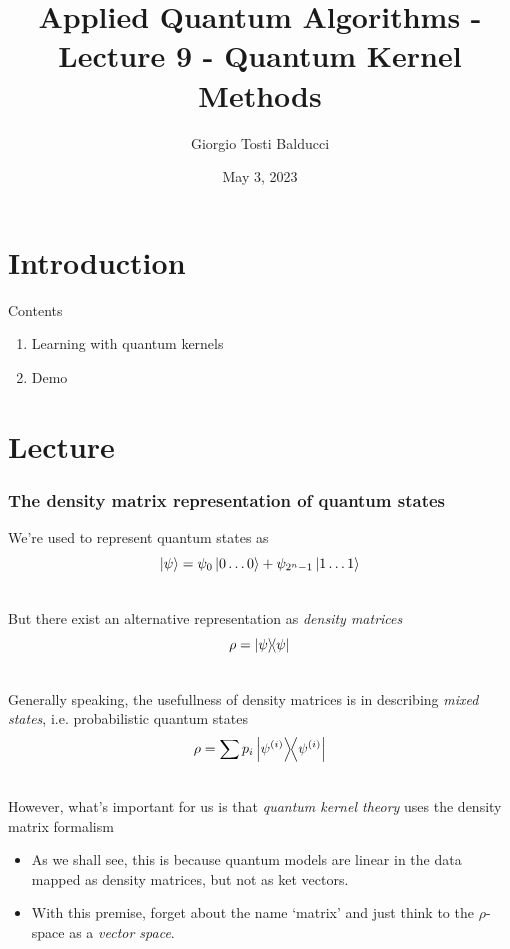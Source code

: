 \documentclass[aspectratio=43]{beamer}
\title[]{Applied Quantum Algorithms - Lecture 9 - Quantum Kernel Methods}
\institute[]{Delft University of Technology, The Netherlands}
\author{Giorgio Tosti Balducci}
\date{May 3, 2023}
\renewcommand{\cite}[1]{\footnote<.->[frame]{\fullcite{#1}}}
\begin{document}
\section{Introduction}
{
\frame{\titlepage}
}

\begin{frame}{Contents} %
\begin{enumerate}
  \item Learning with quantum kernels
  \item Demo
\end{enumerate}
\end{frame}

\section{Lecture}

\begin{frame}
  \frametitle{The density matrix representation of quantum states}
  \small
  We're used to represent quantum states as
  \[\ket{\psi} = \psi_0\ket{0\dots 0} + \psi_{2^n-1}\ket{1\dots 1}\] 

  \ \\
  \pause
  But there exist an alternative representation as \emph{density matrices}
  \[\rho = \ketbra{\psi}{\psi}\]

  \ \\
  Generally speaking, the usefullness of density matrices is in describing \emph{mixed states}, i.e. probabilistic quantum states
  \[\rho = \sum p_i \ketbra{\psi^{(i)}}{\psi^{(i)}}\]

  \ \\
  \pause
  However, what's important for us is that \emph{quantum kernel theory} uses the density matrix formalism
  \begin{itemize}
    \item<4-> As we shall see, this is because quantum models are linear in the data mapped as density matrices, but not as ket vectors.
    \item<5-> With this premise, forget about the name `matrix' and just think to the $\rho$-space as a \emph{vector space}.
  \end{itemize}
\end{frame}
\end{document}
